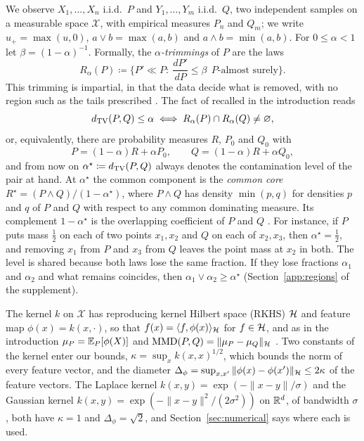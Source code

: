 We observe $X_1,\dots,X_n$ i.i.d.\ $P$ and $Y_1,\dots,Y_m$ i.i.d.\ $Q$, two independent samples on a measurable space
$\mathcal X$, with empirical measures $P_n$ and $Q_m$; we write $u_+=\max(u,0)$, $a\vee b=\max(a,b)$ and
$a\wedge b=\min(a,b)$. For $0\le\alpha<1$ let $\beta=(1-\alpha)^{-1}$. Formally, the \emph{$\alpha$-trimmings} of $P$ are the laws
\begin{equation}
R_\alpha(P)\coloneqq\Big\{P'\ll P:\ \frac{dP'}{dP}\le\beta\ \ P\text{-almost surely}\Big\}.
\label{eq:trimset}
\end{equation}
This trimming is impartial, in that the data decide what is removed, with no region such as the tails prescribed
\citep{gordaliza1991best,cuesta1997trimmed}. The fact of \citet{alvarez2012similarity} recalled in the introduction reads
\begin{equation}
d_{\mathrm{TV}}(P,Q)\le\alpha
\iff
R_\alpha(P)\cap R_\alpha(Q)\neq\varnothing ,
\label{eq:tvintersect}
\end{equation}
or, equivalently, there are probability measures $R$, $P_0$ and $Q_0$ with
\begin{equation}
P=(1-\alpha)R+\alpha P_0,
\qquad
Q=(1-\alpha)R+\alpha Q_0 ,
\label{eq:contam}
\end{equation}
and from now on $\alpha^\star\coloneqq d_{\mathrm{TV}}(P,Q)$ always denotes the contamination level of the pair at hand. At
$\alpha^\star$ the common component is the \emph{common core} $R^\star=(P\wedge Q)/(1-\alpha^\star)$, where $P\wedge Q$ has density $\min(p,q)$ for
densities $p$ and $q$ of $P$ and $Q$ with respect to any common dominating measure. Its complement $1-\alpha^\star$ is the overlapping
coefficient of $P$ and $Q$ \citep{inman1989overlapping}. For instance, if $P$ puts mass $\tfrac12$ on each of two
points $x_1,x_2$ and $Q$ on each of $x_2,x_3$, then $\alpha^\star=\tfrac12$, and removing $x_1$ from $P$ and $x_3$
from $Q$ leaves the point mass at $x_2$ in both. The level is shared because both laws lose the same fraction. If
they lose fractions $\alpha_1$ and $\alpha_2$ and what remains coincides, then $\alpha_1\vee\alpha_2\ge\alpha^\star$
(Section~\ref{app:regions} of the supplement).

The kernel $k$ on $\mathcal X$ has reproducing kernel Hilbert space (RKHS) $\mathcal{H}$ and feature map
$\phi(x)=k(x,\cdot)$, so that $f(x)=\langle f,\phi(x)\rangle_{\mathcal{H}}$ for $f\in\mathcal{H}$, and as in the introduction
$\mu_P=\mathbb{E}_P[\phi(X)]$ and $\operatorname{MMD}(P,Q)=\|\mu_P-\mu_Q\|_{\mathcal{H}}$ \citep{gretton2012kernel,muandet2017kernel}. Two constants of the kernel
enter our bounds, $\kappa=\sup_xk(x,x)^{1/2}$, which bounds the norm of every feature vector, and the diameter
$\Delta_\phi=\sup_{x,x'}\|\phi(x)-\phi(x')\|_{\mathcal{H}}\le2\kappa$ of the feature vectors. The Laplace kernel
$k(x,y)=\exp(-\|x-y\|/\sigma)$ and the Gaussian kernel $k(x,y)=\exp(-\|x-y\|^2/(2\sigma^2))$ on $\mathbb{R}^d$, of bandwidth $\sigma$, both have
$\kappa=1$ and $\Delta_\phi=\sqrt2$, and Section~\ref{sec:numerical} says where each is used.

